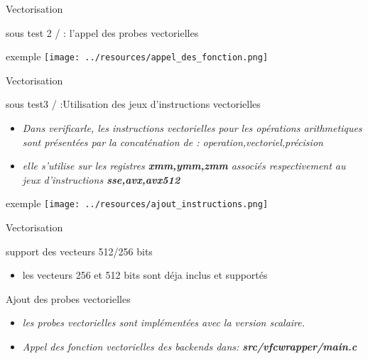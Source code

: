 \documentclass{beamer}
\begin{document}
\begin{frame}{Vectorisation}
\begin{block}{sous test 2 / : l'appel des probes vectorielles}
\end{block}
\begin{block}{exemple}
  \centering\texttt{[image: ../resources/appel\_des\_fonction.png]}
\end{block}


  
        
\end{frame}

\begin{frame}{Vectorisation}   

\begin{block}{sous test3 / :Utilisation des jeux d’instructions vectorielles}
     \begin{itemize}
     \item\textit{Dans verificarle, les instructions vectorielles pour les opérations arithmetiques sont présentées par la concaténation de  : operation,vectoriel,précision } 
      \item\textit{elle s'utilise sur les registres \textbf{xmm,ymm,zmm } associés respectivement au jeux d'instructions \textbf{sse,avx,avx512} } 
      
   \end{itemize}
  \end{block}
  \begin{block}{exemple}
  \centering\texttt{[image: ../resources/ajout\_instructions.png]}
\end{block}
 \end{frame}

\begin{frame}{Vectorisation}         
\begin{block}{support des vecteurs 512/256 bits}
     \begin{itemize}
         \item les vecteurs 256 et 512 bits sont déja inclus et supportés
     \end{itemize}
     
\end{block}
\begin{block}{Ajout des probes vectorielles}
    \begin{itemize}
    \item\textit{les probes vectorielles sont implémentées avec la version scalaire.}
    \item\textit{Appel des fonction vectorielles des backends dans: \textbf{src/vfcwrapper/main.c} } 
   \end{itemize}  
\end{block}
 \end{frame}
\end{document}
